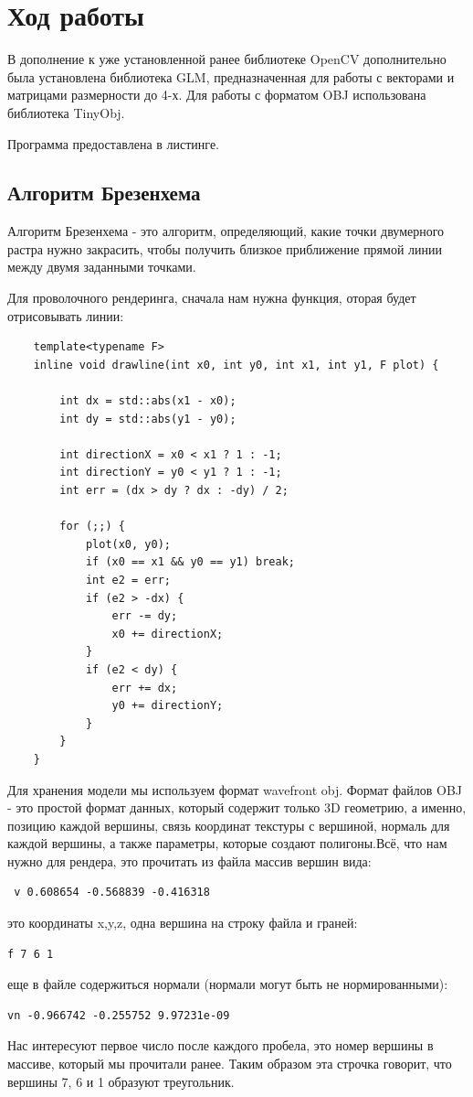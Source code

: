 \documentclass[14pt,a4paper,report]{report}
\begin{document}
\section{Ход работы}
В дополнение к уже установленной ранее библиотеке OpenCV дополнительно была установлена библиотека GLM, предназначенная для работы с векторами и матрицами размерности до 4-х. Для работы с форматом OBJ использована библиотека TinyObj.

Программа предоставлена в листинге.
\subsection{Алгоритм Брезенхема}

Алгоритм Брезенхема - это алгоритм, определяющий, какие точки двумерного растра нужно закрасить, чтобы получить близкое приближение прямой линии между двумя заданными точками.

Для проволочного рендеринга, сначала нам нужна функция, оторая будет отрисовывать линии:
\begin{lstlisting}
    template<typename F>
    inline void drawline(int x0, int y0, int x1, int y1, F plot) {

        int dx = std::abs(x1 - x0);
        int dy = std::abs(y1 - y0);

        int directionX = x0 < x1 ? 1 : -1;
        int directionY = y0 < y1 ? 1 : -1;
        int err = (dx > dy ? dx : -dy) / 2;

        for (;;) {
            plot(x0, y0);
            if (x0 == x1 && y0 == y1) break;
            int e2 = err;
            if (e2 > -dx) {
                err -= dy;
                x0 += directionX;
            }
            if (e2 < dy) {
                err += dx;
                y0 += directionY;
            }
        }
    }
\end{lstlisting}


Для хранения модели мы используем формат wavefront obj. Формат файлов OBJ - это простой формат данных, который содержит только 3D геометрию, а именно, позицию каждой вершины, связь координат текстуры с вершиной, нормаль для каждой вершины, а также параметры, которые создают полигоны.Всё, что нам нужно для рендера, это прочитать из файла массив вершин вида:

\begin{lstlisting}
 v 0.608654 -0.568839 -0.416318 
\end{lstlisting}
это координаты x,y,z, одна вершина на строку файла и граней:
\begin{lstlisting}
f 7 6 1 
\end{lstlisting}
еще в файле содержиться нормали (нормали могут быть не нормированными):
\begin{lstlisting}
vn -0.966742 -0.255752 9.97231e-09 
\end{lstlisting}
Нас интересуют первое число после каждого пробела, это номер вершины в массиве, который мы прочитали ранее. Таким образом эта строчка говорит, что вершины 7, 6 и 1 образуют треугольник.
\end{document}
